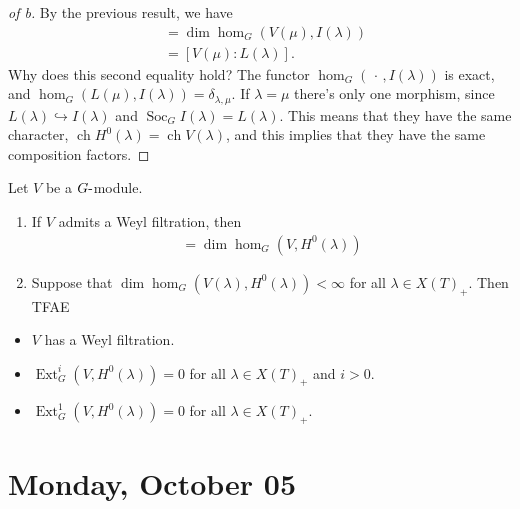 \begin{proof}[of b]

By the previous result, we have
\begin{align*}  
[I(\lambda): H^0(\mu) ] 
&= \dim \hom_G(V(\mu), I(\lambda)) \\
&= [V(\mu): L(\lambda) ]
.\end{align*}
Why does this second equality hold? The functor
\(\hom_G({\,\cdot\,}, I(\lambda))\) is exact, and
\(\hom_G(L(\mu), I(\lambda)) = \delta_{\lambda, \mu}\). If
\(\lambda = \mu\) there's only one morphism, since
\(L(\lambda) \hookrightarrow I(\lambda)\) and
\(\operatorname{Soc}_G I(\lambda) = L(\lambda)\). This means that they
have the same character,
\(\operatorname{ch}H^0(\lambda) = \operatorname{ch}V(\lambda)\), and
this implies that they have the same composition factors.

\end{proof}

\begin{theorem}

Let \(V\) be a \(G{\hbox{-}}\)module.

\begin{enumerate}
\def\labelenumi{\alph{enumi}.}
\item
  If \(V\) admits a Weyl filtration, then
  \begin{align*}
  [V: V(\lambda)] = \dim \hom_G (V, H^0(\lambda))
  \end{align*}
\item
  Suppose that \(\dim \hom_G(V(\lambda), H^0(\lambda)) < \infty\) for
  all \(\lambda \in X(T)_+\). Then TFAE
\end{enumerate}

\begin{itemize}
\tightlist
\item
  \(V\) has a Weyl filtration.
\item
  \(\operatorname{Ext}^i_G(V, H^0(\lambda)) = 0\) for all
  \(\lambda \in X(T)_+\) and \(i>0\).
\item
  \(\operatorname{Ext}^1_G(V, H^0(\lambda)) = 0\) for all
  \(\lambda \in X(T)_+\).
\end{itemize}

\end{theorem}

\hypertarget{monday-october-05}{%
\section{Monday, October 05}\label{monday-october-05}}

